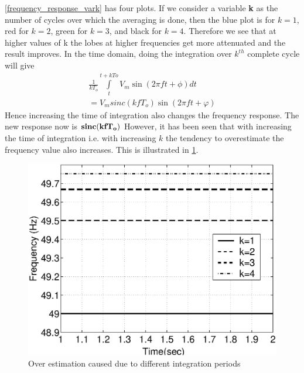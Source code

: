 \figurename\ref{frequency_response_vark} has four plots. If we consider a variable {\bf k} as the number of cycles over which the averaging is done, then the blue plot is for $k=1$, red for $k=2$, green for $k=3$, and black for $k=4$. Therefore we see that at higher values of k the lobes at higher frequencies get more attenuated and the result improves. In the time domain, doing the integration over $k^{th}$ complete cycle will give
\begin{align*}
\frac{1}{kT_o}\int\limits_t^{t+kTo}V_m \sin(2\pi f t +\phi)dt\\
=V_m sinc(kf T_o)\sin(2\pi f t +\varphi)
\end{align*}
Hence increasing the time of integration also changes the frequency response. The new response now is ${\bf sinc(kfT_o)}$
However, it has been seen that with increasing the time of integration i.e. with increasing $k$ the tendency to overestimate the frequency value also increases. This is illustrated in \figurename\ref{vark}.
\begin{figure}[!t]
\centering
\includegraphics[scale=0.3]{overunderestimatenoshift}
\caption{Over estimation caused due to different integration periods}
\label{vark}
\end{figure}
